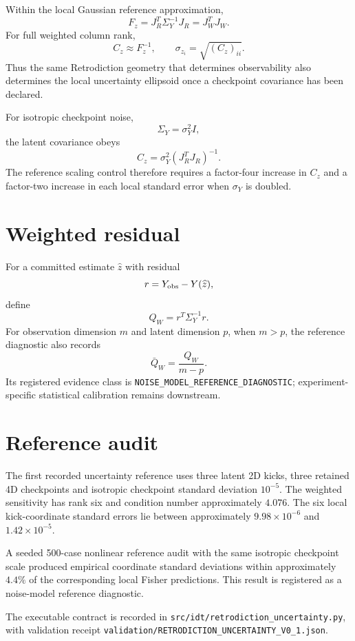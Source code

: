 \documentclass[11pt]{book}
\begin{document}
Within the local Gaussian reference approximation,
\[
\boxed{
F_z
=J_R^T\Sigma_Y^{-1}J_R
=J_W^TJ_W.
}
\]
For full weighted column rank,
\[
\boxed{
C_z\approx F_z^{-1},
\qquad
\sigma_{z_i}=\sqrt{(C_z)_{ii}}.
}
\]
Thus the same Retrodiction geometry that determines observability also determines the local uncertainty ellipsoid once a checkpoint covariance has been declared.

For isotropic checkpoint noise,
\[
\Sigma_Y=\sigma_Y^2 I,
\]
the latent covariance obeys
\[
\boxed{
C_z=\sigma_Y^2(J_R^TJ_R)^{-1}.
}
\]
The reference scaling control therefore requires a factor-four increase in \(C_z\) and a factor-two increase in each local standard error when \(\sigma_Y\) is doubled.

\section{Weighted residual}

For a committed estimate \(\widehat z\) with residual
\[
r=Y_{\rm obs}-Y(\widehat z),
\]
define
\[
\boxed{
Q_W=r^T\Sigma_Y^{-1}r.
}
\]
For observation dimension \(m\) and latent dimension \(p\), when \(m>p\), the reference diagnostic also records
\[
\boxed{
\bar Q_W=\frac{Q_W}{m-p}.
}
\]
Its registered evidence class is \texttt{NOISE\_MODEL\_REFERENCE\_DIAGNOSTIC}; experiment-specific statistical calibration remains downstream.

\section{Reference audit}

The first recorded uncertainty reference uses three latent 2D kicks, three retained 4D checkpoints and isotropic checkpoint standard deviation \(10^{-5}\). The weighted sensitivity has rank six and condition number approximately \(4.076\). The six local kick-coordinate standard errors lie between approximately \(9.98\times10^{-6}\) and \(1.42\times10^{-5}\).

A seeded 500-case nonlinear reference audit with the same isotropic checkpoint scale produced empirical coordinate standard deviations within approximately \(4.4\%\) of the corresponding local Fisher predictions. This result is registered as a noise-model reference diagnostic.

The executable contract is recorded in \texttt{src/idt/retrodiction\_uncertainty.py}, with validation receipt \texttt{validation/RETRODICTION\_UNCERTAINTY\_V0\_1.json}.
\end{document}
